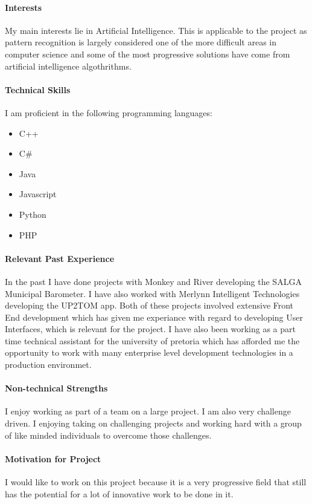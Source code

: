 \documentclass[12pt]{article}
\begin{document}
\paragraph{Interests}
My main interests lie in Artificial Intelligence. This is applicable to the project as pattern recognition is largely considered one of the more difficult areas in computer science and some of the most progressive solutions have come from artificial intelligence algothrithms.

\paragraph{Technical Skills}
	I am proficient in the following programming languages:
	\begin{itemize}
		\item C++
		\item C#
		\item Java
		\item Javascript
		\item Python
		\item PHP
	\end{itemize}

\paragraph{Relevant Past Experience}
	In the past I have done projects with Monkey and River developing the SALGA Municipal Barometer. I have also worked with Merlynn Intelligent Technologies developing the UP2TOM app. Both of these projects involved extensive Front End development which has given me experiance with regard to developing User Interfaces, which is relevant for the project. I have also been working as a part time technical assistant for the university of pretoria which has afforded me the opportunity to work with many enterprise level development technologies in a production environmet.

\paragraph{Non-technical Strengths}
	I enjoy working as part of a team on a large project. I am also very challenge driven. I enjoying taking on challenging projects and working hard with a group of like minded individuals to overcome those challenges.

\paragraph{Motivation for Project}
	I would like to work on this project because it is a very progressive field that still has the potential for a lot of innovative work to be done in it.
\end{document}
